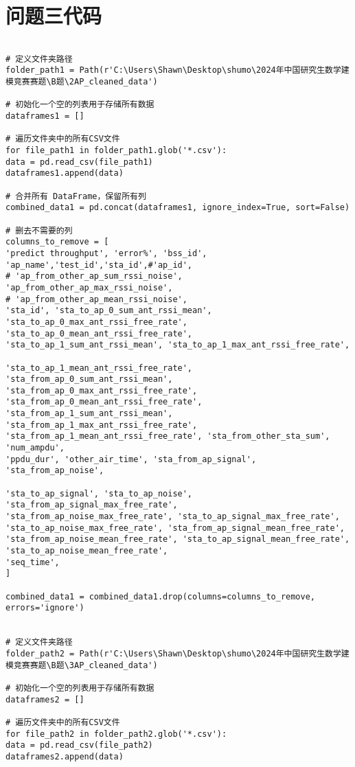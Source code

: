 \documentclass[bwprint,fontset=windows]{gmcmthesis}
\begin{document}
\section{问题三代码}


\begin{lstlisting}
	
# 定义文件夹路径
folder_path1 = Path(r'C:\Users\Shawn\Desktop\shumo\2024年中国研究生数学建模竞赛赛题\B题\2AP_cleaned_data')

# 初始化一个空的列表用于存储所有数据
dataframes1 = []

# 遍历文件夹中的所有CSV文件
for file_path1 in folder_path1.glob('*.csv'):
data = pd.read_csv(file_path1)
dataframes1.append(data)

# 合并所有 DataFrame，保留所有列
combined_data1 = pd.concat(dataframes1, ignore_index=True, sort=False)

# 删去不需要的列
columns_to_remove = [
'predict throughput', 'error%', 'bss_id', 'ap_name','test_id','sta_id',#'ap_id',
# 'ap_from_other_ap_sum_rssi_noise', 'ap_from_other_ap_max_rssi_noise',
# 'ap_from_other_ap_mean_rssi_noise', 
'sta_id', 'sta_to_ap_0_sum_ant_rssi_mean',
'sta_to_ap_0_max_ant_rssi_free_rate', 'sta_to_ap_0_mean_ant_rssi_free_rate',
'sta_to_ap_1_sum_ant_rssi_mean', 'sta_to_ap_1_max_ant_rssi_free_rate',

'sta_to_ap_1_mean_ant_rssi_free_rate', 'sta_from_ap_0_sum_ant_rssi_mean',
'sta_from_ap_0_max_ant_rssi_free_rate', 'sta_from_ap_0_mean_ant_rssi_free_rate',
'sta_from_ap_1_sum_ant_rssi_mean', 'sta_from_ap_1_max_ant_rssi_free_rate',
'sta_from_ap_1_mean_ant_rssi_free_rate', 'sta_from_other_sta_sum', 'num_ampdu',
'ppdu_dur', 'other_air_time', 'sta_from_ap_signal', 'sta_from_ap_noise',

'sta_to_ap_signal', 'sta_to_ap_noise', 'sta_from_ap_signal_max_free_rate',
'sta_from_ap_noise_max_free_rate', 'sta_to_ap_signal_max_free_rate',
'sta_to_ap_noise_max_free_rate', 'sta_from_ap_signal_mean_free_rate',
'sta_from_ap_noise_mean_free_rate', 'sta_to_ap_signal_mean_free_rate',
'sta_to_ap_noise_mean_free_rate',
'seq_time',
]

combined_data1 = combined_data1.drop(columns=columns_to_remove, errors='ignore')


# 定义文件夹路径
folder_path2 = Path(r'C:\Users\Shawn\Desktop\shumo\2024年中国研究生数学建模竞赛赛题\B题\3AP_cleaned_data')

# 初始化一个空的列表用于存储所有数据
dataframes2 = []

# 遍历文件夹中的所有CSV文件
for file_path2 in folder_path2.glob('*.csv'):
data = pd.read_csv(file_path2)
dataframes2.append(data)


\end{lstlisting}
\end{document}
